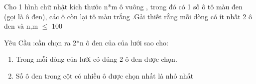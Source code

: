 Cho 1 hình chữ nhật kích thước n*m ô vuông , trong đó có 1 số ô tô màu đen (gọi là ô đen), các ô còn lại tô màu trắng .Gải thiết rằng mỗi dòng có ít nhất 2 ô đen và n,m $\le$ 100

Yêu Cầu :cần chọn ra 2*n ô đen của của lưới sao cho:
\begin{enumerate}
	\item Trong mỗi dòng của lưới có đúng 2 ô đen được chọn.
	\item Số ô đen trong cột có nhiều ô được chọn nhất là nhỏ nhất
\end{enumerate}